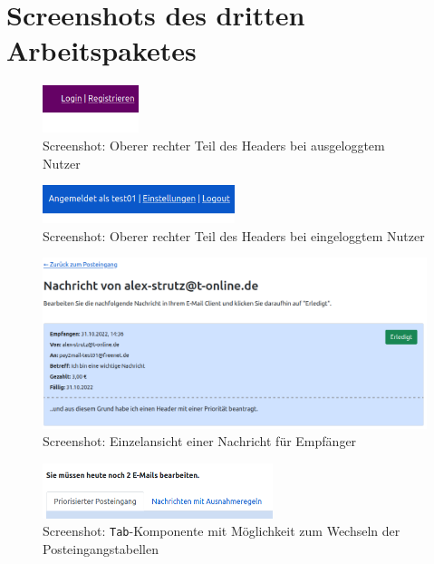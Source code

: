 \newpage
\section{Screenshots des dritten Arbeitspaketes}

\begin{figure}[!h]
	\centering
		\includegraphics[width=0.25\textwidth]{Figures/header1.png}
	\caption{Screenshot: Oberer rechter Teil des Headers bei ausgeloggtem Nutzer}
	\label{fig:screenshot_header1}
\end{figure}

\begin{figure}[!h]
	\centering
		\includegraphics[width=0.5\textwidth]{Figures/header2.png}
	\caption{Screenshot: Oberer rechter Teil des Headers bei eingeloggtem Nutzer}
	\label{fig:screenshot_header2}
\end{figure}

\begin{figure}[!h]
	\centering
		\includegraphics[width=1.1\textwidth]{Figures/message.png}
	\caption{Screenshot: Einzelansicht einer Nachricht für Empfänger}
	\label{fig:screenshot_message}
\end{figure}

\begin{figure}[!h]
	\centering
		\includegraphics[width=0.6\textwidth]{Figures/tab.png}
	\caption{Screenshot: \texttt{Tab}-Komponente mit Möglichkeit zum Wechseln der Posteingangstabellen}
	\label{fig:screenshot_inbox2}
\end{figure}

